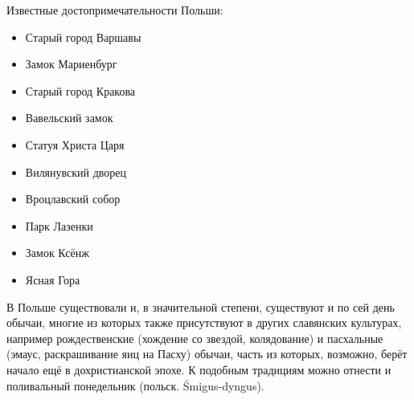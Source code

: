 \documentclass[12pt]{article}
\begin{document}
Известные достопримечательности Польши:
\begin{itemize}[beginpenalty=10000]
    \item Старый город Варшавы
    \item Замок Мариенбург
    \item Старый город Кракова
    \item Вавельский замок
    \item Статуя Христа Царя
    \item Вилянувский дворец
    \item Вроцлавский собор
    \item Парк Лазенки
    \item Замок Ксёнж
    \item Ясная Гора
\end{itemize}

В Польше существовали и, в значительной степени, существуют и по сей день обычаи, многие из которых также присутствуют в других славянских культурах, например рождественские (хождение со звездой, колядование) и пасхальные (эмаус, раскрашивание яиц на Пасху) обычаи, часть из которых, возможно, берёт начало ещё в дохристианской эпохе.
К подобным традициям можно отнести и поливальный понедельник (польск. Śmigus-dyngus).
\end{document}
